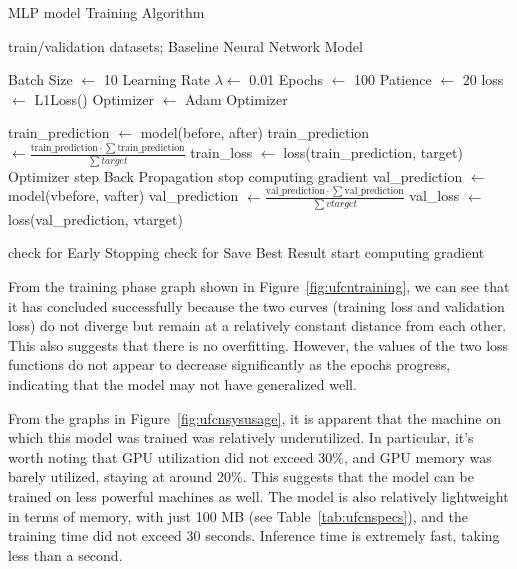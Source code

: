 \begin{algorithm}[H]
	\caption{MLP model Training Algorithm}\label{alg:ufcntraining}
	\begin{algorithmic}
		\Require train/validation datasets; Baseline Neural Network Model

		\State Batch Size $\gets$ 10
		\State Learning Rate $\lambda \gets$ 0.01
		\State Epochs $\gets$ 100
		\State Patience $\gets$ 20
		\State loss $\gets$ L1Loss()
		\State Optimizer $\gets$ Adam Optimizer
		\State

		\State train\_prediction $\gets$ model(before, after) 
		\State train\_prediction $\gets \frac{\text{train\_prediction} \cdot \sum\text{train\_prediction}}{\sum target}$ 
		\State train\_loss $\gets$ loss(train\_prediction, target)
		\State Optimizer step
		\State Back Propagation
		\EndFor
		\State stop computing gradient
		\State val\_prediction $\gets$ model(vbefore, vafter) 
		\State val\_prediction $\gets \frac{\text{val\_prediction} \cdot \sum\text{val\_prediction}}{\sum vtarget}$ 
		\State val\_loss $\gets$ loss(val\_prediction, vtarget)
		\EndFor

		\State check for Early Stopping
		\State check for Save Best Result
		\State start computing gradient
		\EndFor
	\end{algorithmic}
\end{algorithm}

From the training phase graph shown in Figure~\ref{fig:ufcntraining},
we can see that it has concluded successfully because the two curves
(training loss and validation loss) do not diverge but remain at a
relatively constant distance from each other.
This also suggests that there is no overfitting.
However, the values of the two loss functions do not appear to decrease
significantly as the epochs progress, indicating that the model may
not have generalized well.

From the graphs in Figure~\ref{fig:ufcnsysusage}, it is apparent that the
machine on which this model was trained was relatively underutilized.
In particular, it's worth noting that GPU utilization did not exceed 30\%,
and GPU memory was barely utilized, staying at around 20\%.
This suggests that the model can be trained on less powerful machines as well.
The model is also relatively lightweight in terms of memory,
with just 100 MB (see Table~\ref{tab:ufcnspecs}), and the training time
did not exceed 30 seconds.
Inference time is extremely fast, taking less than a second.

